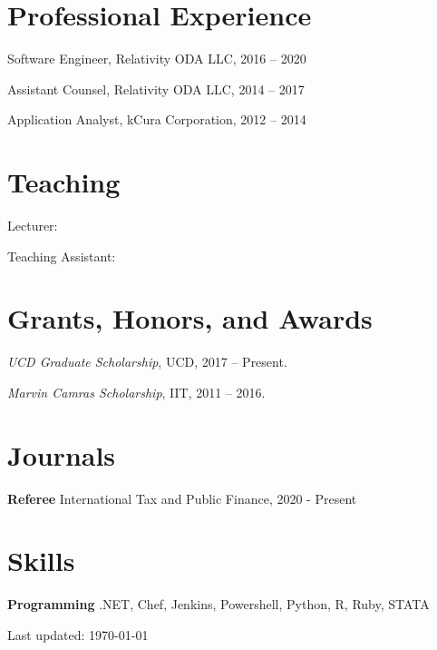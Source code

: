 \documentclass[letterpaper]{article}
\renewenvironment{itemize}{
  \begin{list}{}{
    \setlength{\leftmargin}{1.5em}
  }
}{
  \end{list}
}
\begin{document}
\begin{itemize}
\end{itemize}


\section*{Professional Experience}
\begin{itemize}
\item{Software Engineer, Relativity ODA LLC, 2016 -- 2020}
\item{Assistant Counsel, Relativity ODA LLC, 2014 -- 2017}
\item{Application Analyst, kCura Corporation, 2012 -- 2014}
\end{itemize}


\section*{Teaching}
\begin{itemize}
\item {Lecturer:}
\item {Teaching Assistant:}
\end{itemize}


\section*{Grants, Honors, and Awards}
\begin{itemize}
\item{\emph{UCD Graduate Scholarship}, UCD, 2017 -- Present.}
\item{\emph{Marvin Camras Scholarship}, IIT, 2011 -- 2016. }
\end{itemize}

\section*{Journals}
\begin{itemize}
\item {\bf Referee}
\subitem International Tax and Public Finance, 2020 - Present
\end{itemize}

\section*{Skills}
\begin{itemize}
\item {\bf Programming}
\subitem .NET, Chef, Jenkins, Powershell, Python, R, Ruby, STATA
\end{itemize}

\begin{center}
  \begin{footnotesize}
    Last updated: \today \\
  \end{footnotesize}
\end{center}
\end{document}
